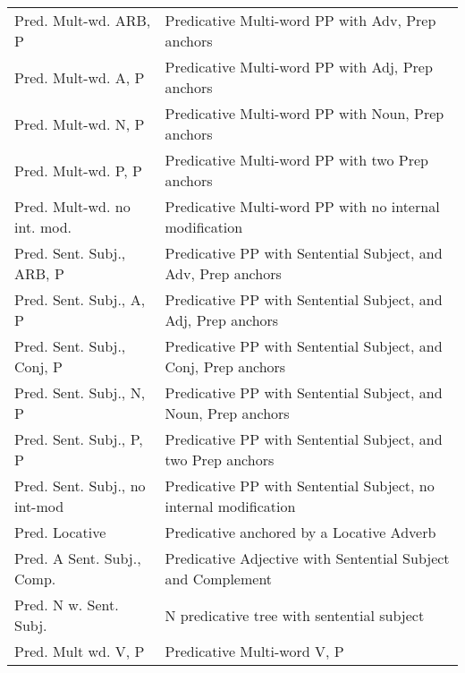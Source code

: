 \begin{tabular}{ll}
Pred. Mult-wd. ARB, P & Predicative Multi-word PP with Adv, Prep anchors\\
Pred. Mult-wd. A, P & Predicative Multi-word PP with Adj, Prep anchors\\
Pred. Mult-wd. N, P & Predicative Multi-word PP with Noun, Prep
anchors\\
Pred. Mult-wd. P, P & Predicative Multi-word PP with two Prep
anchors\\
Pred. Mult-wd. no int. mod. & Predicative Multi-word PP with no internal
modification\\
Pred. Sent. Subj., ARB, P & Predicative PP with Sentential Subject, and
Adv, Prep anchors\\
Pred. Sent. Subj., A, P & Predicative PP with Sentential Subject, and
Adj, Prep anchors\\
Pred. Sent. Subj., Conj, P & Predicative PP with Sentential Subject, and
Conj, Prep anchors\\
Pred. Sent. Subj., N, P & Predicative PP with Sentential Subject, and
Noun, Prep anchors\\
Pred. Sent. Subj., P, P & Predicative PP with Sentential Subject, and two
Prep anchors\\
Pred. Sent. Subj., no int-mod & Predicative PP with Sentential Subject,
no internal modification\\
Pred. Locative & Predicative anchored by a Locative Adverb\\
Pred. A Sent. Subj., Comp. & Predicative Adjective with Sentential
Subject and Complement\\
 Pred. N w. Sent. Subj. & N predicative tree with sentential subject \\
 Pred. Mult wd. V, P & Predicative Multi-word V, P 
\end{tabular}
\normalsize
















